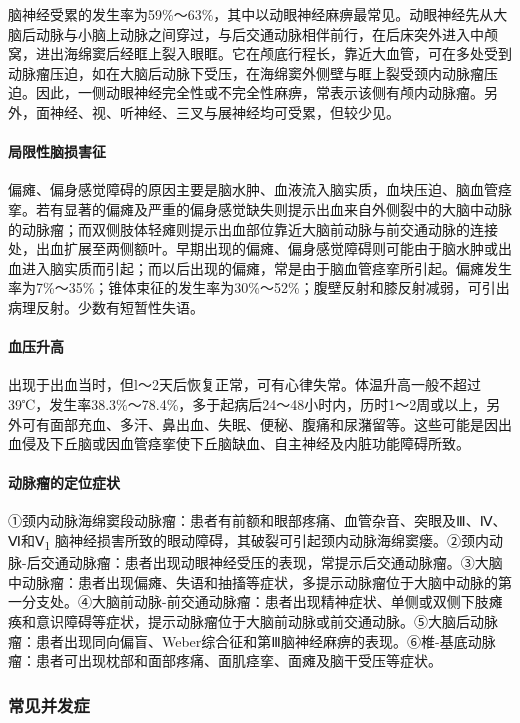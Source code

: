 脑神经受累的发生率为59\%～63\%，其中以动眼神经麻痹最常见。动眼神经先从大脑后动脉与小脑上动脉之间穿过，与后交通动脉相伴前行，在后床突外进入中颅窝，进出海绵窦后经眶上裂入眼眶。它在颅底行程长，靠近大血管，可在多处受到动脉瘤压迫，如在大脑后动脉下受压，在海绵窦外侧壁与眶上裂受颈内动脉瘤压迫。因此，一侧动眼神经完全性或不完全性麻痹，常表示该侧有颅内动脉瘤。另外，面神经、视、听神经、三叉与展神经均可受累，但较少见。

\paragraph{局限性脑损害征}

偏瘫、偏身感觉障碍的原因主要是脑水肿、血液流入脑实质，血块压迫、脑血管痉挛。若有显著的偏瘫及严重的偏身感觉缺失则提示出血来自外侧裂中的大脑中动脉的动脉瘤；而双侧肢体轻瘫则提示出血部位靠近大脑前动脉与前交通动脉的连接处，出血扩展至两侧额叶。早期出现的偏瘫、偏身感觉障碍则可能由于脑水肿或出血进入脑实质而引起；而以后出现的偏瘫，常是由于脑血管痉挛所引起。偏瘫发生率为7\%～35\%；锥体束征的发生率为30\%～52\%；腹壁反射和膝反射减弱，可引出病理反射。少数有短暂性失语。

\paragraph{血压升高}

出现于出血当时，但l～2天后恢复正常，可有心律失常。体温升高一般不超过39℃，发生率38.3\%～78.4\%，多于起病后24～48小时内，历时1～2周或以上，另外可有面部充血、多汗、鼻出血、失眠、便秘、腹痛和尿潴留等。这些可能是因出血侵及下丘脑或因血管痉挛使下丘脑缺血、自主神经及内脏功能障碍所致。

\paragraph{动脉瘤的定位症状}

①颈内动脉海绵窦段动脉瘤：患者有前额和眼部疼痛、血管杂音、突眼及Ⅲ、Ⅳ、Ⅵ和Ⅴ\textsubscript{1}
脑神经损害所致的眼动障碍，其破裂可引起颈内动脉海绵窦瘘。②颈内动脉-后交通动脉瘤：患者出现动眼神经受压的表现，常提示后交通动脉瘤。③大脑中动脉瘤：患者出现偏瘫、失语和抽搐等症状，多提示动脉瘤位于大脑中动脉的第一分支处。④大脑前动脉-前交通动脉瘤：患者出现精神症状、单侧或双侧下肢瘫痪和意识障碍等症状，提示动脉瘤位于大脑前动脉或前交通动脉。⑤大脑后动脉瘤：患者出现同向偏盲、Weber综合征和第Ⅲ脑神经麻痹的表现。⑥椎-基底动脉瘤：患者可出现枕部和面部疼痛、面肌痉挛、面瘫及脑干受压等症状。

\subsubsection{常见并发症}

